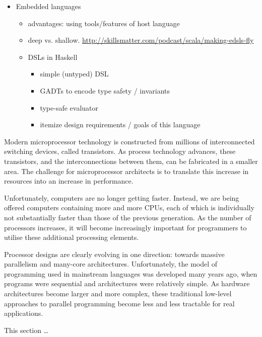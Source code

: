 \begin{itemize}
    \item Embedded languages
        \begin{itemize}
            \item advantages: using tools/features of host language
            \item deep vs. shallow. \url{http://skillsmatter.com/podcast/scala/making-edsls-fly}
            \item DSLs in Haskell
                \begin{itemize}
                    \item simple (untyped) DSL
                    \item GADTs to encode type safety / invariants
                    \item type-safe evaluator
                    \item itemize design requirements / goals of this language
                \end{itemize}
        \end{itemize}

\end{itemize}



Modern microprocessor technology is constructed from millions of interconnected
switching devices, called transistors. As process technology advances, these
transistors, and the interconnections between them, can be fabricated in a
smaller area. The challenge for microprocessor architects is to translate this
increase in resources into an increase in performance.

Unfortunately, computers are no longer getting faster. Instead, we are being
offered computers containing more and more CPUs, each of which is individually
not substantially faster than those of the previous generation. As the number of
processors increases, it will become increasingly important for programmers to
utilise these additional processing elements.

Processor designs are clearly evolving in one direction: towards massive
parallelism and many-core architectures. Unfortunately, the model of programming
used in mainstream languages was developed many years ago, when programs were
sequential and architectures were relatively simple. As hardware architectures
become larger and more complex, these traditional low-level approaches to
parallel programming become less and less tractable for real applications.

This section \ldots


